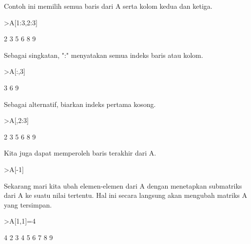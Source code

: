 \documentclass{article}
\newenvironment{eulernotebook}{\par}{\par}
\newenvironment{eulercomment}{\par\medskip}{\par\medskip}
\begin{document}
\begin{eulernotebook}
\begin{eulercomment}
\begin{eulercomment}
\begin{eulercomment}
\begin{eulercomment}
\begin{eulercomment}
\begin{eulercomment}
\begin{eulercomment}
Contoh ini memilih semua baris dari A serta kolom kedua dan ketiga.
\end{eulercomment}
\begin{eulerprompt}
>A[1:3,2:3]
\end{eulerprompt}
\begin{euleroutput}
              2             3 
              5             6 
              8             9 
\end{euleroutput}
\begin{eulercomment}
Sebagai singkatan, ":" menyatakan semua indeks baris atau kolom.
\end{eulercomment}
\begin{eulerprompt}
>A[:,3]
\end{eulerprompt}
\begin{euleroutput}
              3 
              6 
              9 
\end{euleroutput}
\begin{eulercomment}
Sebagai alternatif, biarkan indeks pertama kosong.
\end{eulercomment}
\begin{eulerprompt}
>A[,2:3]
\end{eulerprompt}
\begin{euleroutput}
              2             3 
              5             6 
              8             9 
\end{euleroutput}
\begin{eulercomment}
Kita juga dapat memperoleh baris terakhir dari A.
\end{eulercomment}
\begin{eulerprompt}
>A[-1]
\end{eulerprompt}
\begin{euleroutput}
  [7,  8,  9]
\end{euleroutput}
\begin{eulercomment}
Sekarang mari kita ubah elemen-elemen dari A dengan menetapkan
submatriks dari A ke suatu nilai tertentu. Hal ini secara langsung
akan mengubah matriks A yang tersimpan.
\end{eulercomment}
\begin{eulerprompt}
>A[1,1]=4
\end{eulerprompt}
\begin{euleroutput}
              4             2             3 
              4             5             6 
              7             8             9 
\end{euleroutput}
\begin{eulercomment}

\end{eulercomment}
\end{eulercomment}
\end{eulercomment}
\end{eulercomment}
\end{eulercomment}
\end{eulercomment}
\end{eulercomment}
\end{eulernotebook}
\end{document}
